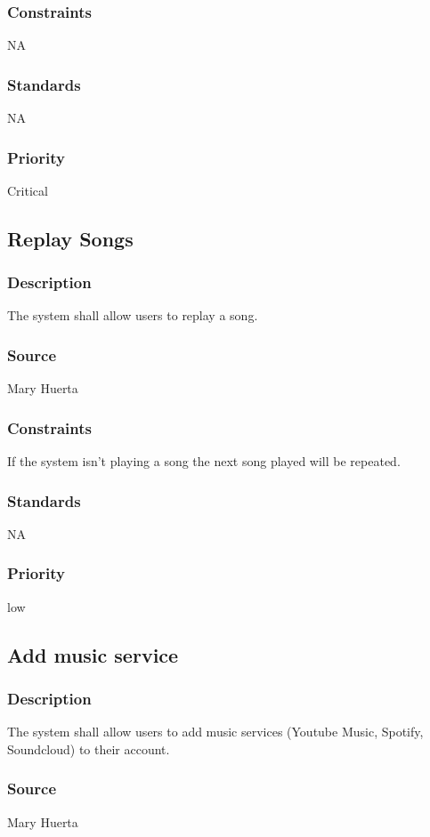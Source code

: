 \subsubsection{Constraints}
NA
\subsubsection{Standards}
NA
\subsubsection{Priority}
Critical



\subsection{Replay Songs}
\subsubsection{Description}
The system shall allow users to replay a song.
\subsubsection{Source}
Mary Huerta
\subsubsection{Constraints}
If the system isn't playing a song the next song played will be repeated. 
\subsubsection{Standards}
NA
\subsubsection{Priority}
low



\subsection{Add music service}
\subsubsection{Description}
The system shall allow users to add music services (Youtube Music, Spotify, Soundcloud) to their account.
\subsubsection{Source}
Mary Huerta
